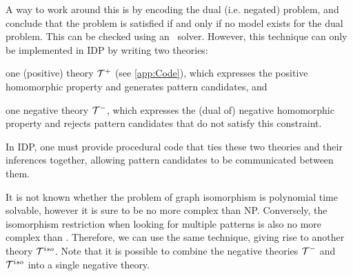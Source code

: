 A way to work around this is by encoding the dual (i.e. negated) problem, and conclude that the problem is satisfied if and only if no model exists for the dual problem.
This can be checked using an \NP\ solver.
However, this technique can only be implemented in IDP by writing two theories: 
\begin{compactitem}
\item one (positive) theory $\mathcal{T}^{+}$ (see \ref{app:Code}), which expresses the positive homomorphic property and generates pattern candidates, and
\item one negative theory $\mathcal{T}^{-}$, which expresses the (dual of) negative homomorphic property and rejects pattern candidates that do not satisfy this constraint.
\end{compactitem}
In IDP, one must provide procedural code that ties these two theories and their inferences together, allowing pattern candidates to be communicated between them.

It is not known whether the problem of graph isomorphism is polynomial time solvable,
however it is sure to be no more complex than NP.
Conversely, the isomorphism restriction when looking for multiple patterns is also no more complex than \coNP.
Therefore, we can use the same technique, giving rise to another theory $\mathcal{T}^{iso}$.
Note that it is possible to combine the negative theories $\mathcal{T}^{-}$ and $\mathcal{T}^{iso}$ into a single negative theory.




